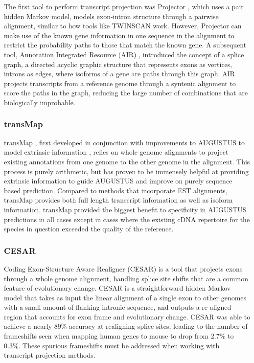 \documentclass[fleqn,10pt]{wlscirep}
\begin{document}
The first tool to perform transcript projection was Projector \cite{meyer2004gene}, which uses a pair hidden Markov model, models exon-intron structure through a pairwise alignment, similar to how tools like TWINSCAN work. However, Projector can make use of the known gene information in one sequence in the alignment to restrict the probability paths to those that match the known gene. A subsequent tool, Annotation Integrated Resource (AIR) \cite{florea2005gene}, introduced the concept of a splice graph, a directed acyclic graphic structure that represents exons as vertices, introns as edges, where isoforms of a gene are paths through this graph. AIR projects transcripts from a reference genome through a syntenic alignment to score the paths in the graph, reducing the large number of combinations that are biologically improbable. 

\subsubsection{transMap}
transMap \cite{stanke2008using}, first developed in conjunction with improvements to AUGUSTUS to model extrinsic information \cite{stanke2004augustus}, relies on whole genome alignments to project existing annotations from one genome to the other genome in the alignment. This process is purely arithmetic, but has proven to be immensely helpful at providing extrinsic information to guide AUGUSTUS and improve on purely sequence based prediction. Compared to methods that incorporate EST alignments, transMap provides both full length transcript information as well as isoform information. transMap provided the biggest benefit to specificity in AUGUSTUS predictions in all cases except in cases where the existing cDNA repertoire for the species in question exceeded the quality of the reference.

\subsubsection{CESAR}
Coding Exon-Structure Aware Realigner (CESAR) \cite{sharma2016coding} is a tool that projects exons through a whole genome alignment, handling splice site shifts that are a common feature of evolutionary change. CESAR is a straightforward hidden Markov model that takes as input the linear alignment of a single exon to other genomes with a small amount of flanking intronic sequence, and outputs a re-aligned region that accounts for exon frame and evolutionary change. CESAR was able to achieve a nearly 89\% accuracy at realigning splice sites, leading to the number of frameshifts seen when mapping human genes to mouse to drop from 2.7\% to 0.3\%. These spurious frameshifts must be addressed when working with transcript projection methods.
\end{document}
